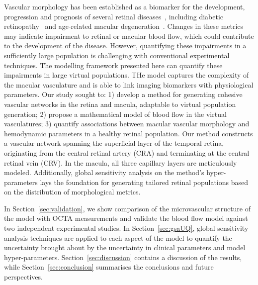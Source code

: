 \documentclass[11pt,]{article}
\begin{document}
Vascular morphology has been established as a biomarker for the development, progression and prognosis of several retinal diseases~\cite{Balaratnasingam_2023,Yao_2020}, including diabetic retinopathy~\cite{Garg2022,Hein_2023} and age-related macular degeneration~\cite{Told2023,Narnaware_2023}.
Changes in these metrics may indicate impairment to retinal or macular blood flow, which could contribute to the development of the disease.
However, quantifying these impairments in a sufficiently large population is challenging with conventional experimental techniques.
The modelling framework presented here can quantify these impairments in large virtual populations.
THe model captures the complexity of the macular vasculature and is able to link imaging biomarkers with physiological parameters.
Our study sought to: 1) develop a method for generating cohesive vascular networks in the retina and macula, adaptable to virtual population generation;
2) propose a mathematical model of blood flow in the virtual vasculatures;
3) quantify associations between macular vascular morphology and hemodynamic parameters in a healthy retinal population.
Our method constructs a vascular network spanning the superficial layer of the temporal retina, originating from the central retinal artery (CRA) and terminating at the central retinal vein (CRV).
In the macula, all three capillary layers are meticulously modeled.
Additionally, global sensitivity analysis on the method's hyper-parameters lays the foundation for generating tailored retinal populations based on the distribution of morphological metrics.

In Section~\ref{sec:validation}, we show comparison of the microvascular structure of the model with OCTA measurements and validate the blood flow model against two independent experimental studies.
In Section~\ref{sec:gsaUQ}, global sensitivity analysis techniques are applied to each aspect of the model to quantify the uncertainty brought about by the uncertainty in clinical parameters and model hyper-parameters.
Section~\ref{sec:discussion} contains a discussion of the results, while Section~\ref{sec:conclusion} summarises the conclusions and future perspectives.
\end{document}
